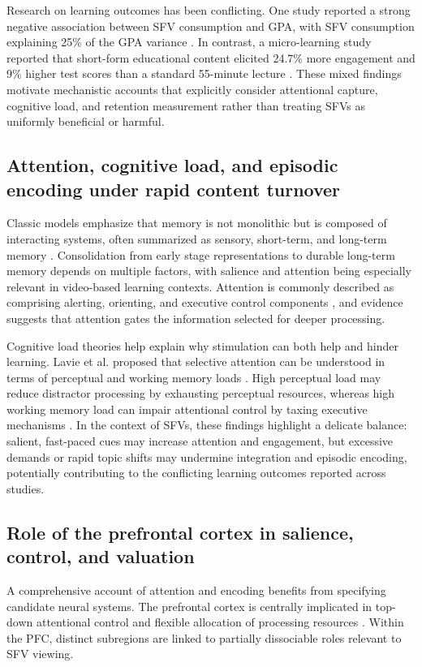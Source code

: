 \documentclass[10pt, twocolumn]{article}
\begin{document}
Research on learning outcomes has been conflicting. One study reported a strong negative association between SFV consumption and GPA, with SFV consumption explaining 25\% of the GPA variance \cite{Haliti-Sylaj_Sadiku}. In contrast, a micro-learning study reported that short-form educational content elicited 24.7\% more engagement and 9\% higher test scores than a standard 55-minute lecture \cite{Zhu_Yuan_Zhang_Huang_Wang_Duan_Lei_Lim_Song_2022}. These mixed findings motivate mechanistic accounts that explicitly consider attentional capture, cognitive load, and retention measurement rather than treating SFVs as uniformly beneficial or harmful.

\subsection{Attention, cognitive load, and episodic encoding under rapid content turnover}
Classic models emphasize that memory is not monolithic but is composed of interacting systems, often summarized as sensory, short-term, and long-term memory \cite{Atkinson_Shiffrin_1968}. Consolidation from early stage representations to durable long-term memory depends on multiple factors, with salience and attention being especially relevant in video-based learning contexts. Attention is commonly described as comprising alerting, orienting, and executive control components \cite{Posner1990TheAS}, and evidence suggests that attention gates the information selected for deeper processing.

Cognitive load theories help explain why stimulation can both help and hinder learning. Lavie et al. proposed that selective attention can be understood in terms of perceptual and working memory loads \cite{Lavie_Hirst_de_Fockert_Viding_2004}. High perceptual load may reduce distractor processing by exhausting perceptual resources, whereas high working memory load can impair attentional control by taxing executive mechanisms \cite{Lavie_Hirst_de_Fockert_Viding_2004}. In the context of SFVs, these findings highlight a delicate balance: salient, fast-paced cues may increase attention and engagement, but excessive demands or rapid topic shifts may undermine integration and episodic encoding, potentially contributing to the conflicting learning outcomes reported across studies.

\subsection{Role of the prefrontal cortex in salience, control, and valuation}
A comprehensive account of attention and encoding benefits from specifying candidate neural systems. The prefrontal cortex is centrally implicated in top-down attentional control and flexible allocation of processing resources \cite{Miller2001AnIT, Buschman2007TopDownVB, Lavie_Hirst_de_Fockert_Viding_2004}. Within the PFC, distinct subregions are linked to partially dissociable roles relevant to SFV viewing.
\end{document}
